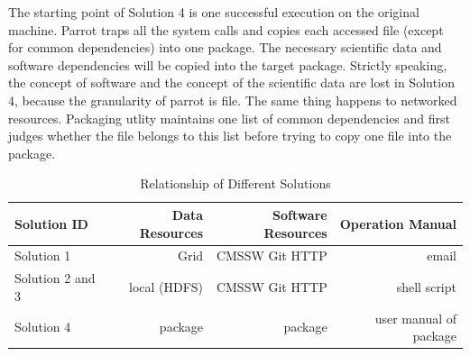 \documentclass{sig-alternate}
\begin{document}
The starting point of Solution 4 is one successful execution on the original machine. 
Parrot traps all the system calls and copies each accessed file (except for common dependencies) into one package.
The necessary scientific data and software dependencies will be copied into the target package.
Strictly speaking, the concept of software and the concept of the scientific data are lost in Solution 4, because
the granularity of parrot is file.
The same thing happens to networked resources.
Packaging utlity maintains one list of common dependencies and first judges whether the file belongs to this list before trying to copy one file into the package.

\begin{table}
    \centering
    \begin{tabular}{|l|r|r|r|}
        \hline
        \bf Solution ID & \bf Data Resources &\bf Software Resources & \bf Operation Manual \\ \hline
        Solution 1& Grid & CMSSW Git HTTP & email \\ \hline
        Solution 2 and 3& local (HDFS) & CMSSW Git HTTP & shell script \\ \hline
        Solution 4& package & package & user manual of package \\ \hline
    \end{tabular}
    \caption{Relationship of Different Solutions}
    \label{table:relationship}
\end{table}



\end{document}
